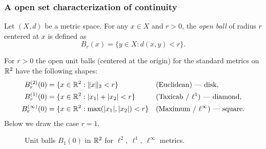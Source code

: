 \subsubsection{A open set characterization of continuity}

\begin{definition}
  Let $(X,d)$ be a metric space. For any $x\in X$ and $r>0$, the \emph{open ball} of radius $r$ centered at $x$ is defined as
  \[
  B_r(x) = \{y\in X:d(x,y)<r\}.
  \]
\end{definition}

\begin{example}
For \(r>0\) the open unit balls (centered at the origin) for the standard metrics on \(\mathbb{R}^2\) have the following shapes:
\[
\begin{aligned}
B_r^{(2)}(0) &= \{x\in\mathbb{R}^2 : \|x\|_2 < r\}      &&\text{(Euclidean) — disk},\\
B_r^{(1)}(0) &= \{x\in\mathbb{R}^2 : |x_1|+|x_2| < r\}  &&\text{(Taxicab / \(\ell^1\)) — diamond},\\
B_r^{(\infty)}(0) &= \{x\in\mathbb{R}^2 : \max(|x_1|,|x_2|) < r\} &&\text{(Maximum / \(\ell^\infty\)) — square}.
\end{aligned}
\]
Below we draw the case \(r=1\).
\end{example}

\begin{figure}[h]
  \centering
  \caption{Unit balls \(B_1(0)\) in \(\mathbb{R}^2\) for \(\ell^2,\ \ell^1,\ \ell^\infty\) metrics.}
\end{figure}

